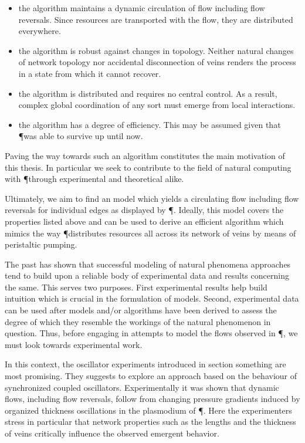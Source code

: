 	\begin{itemize}
		\item the algorithm maintains a dynamic circulation of flow including flow reversals. Since resources are transported with the flow, they are distributed everywhere.
		\item the algorithm is robust against changes in topology. Neither natural changes of network topology nor accidental disconnection of veins renders the process in a state from which it cannot recover.
		\item the algorithm is distributed and requires no central control. As a result, complex global coordination of any sort must emerge from local interactions.
		\item the algorithm has a degree of efficiency. This may be assumed given that \P was able to survive up until now.
	\end{itemize}

	Paving the way towards such an algorithm constitutes the main motivation of this thesis. In particular we seek to contribute to the field of natural computing with \P through experimental and theoretical alike.

	Ultimately, we aim to find an model which yields a circulating flow including flow reversals for individual edges as displayed by \P. Ideally, this model covers the properties listed above and can be used to derive an efficient algorithm which mimics the way \P distributes resources all across its network of veins by means of peristaltic pumping. 

	The past has shown that successful modeling of natural phenomena approaches tend to build upon a reliable body of experimental data and results concerning the same. This serves two purposes. First experimental results help build intuition which is crucial in the formulation of models. Second, experimental data can be used after models and/or algorithms have been derived to assess the degree of which they resemble the workings of the natural phenomenon in question. Thus, before engaging in attempts to model the flows observed in \P, we must look towards experimental work.

	In this context, the oscillator experiments introduced in section something are most promising. They suggests to explore an approach based on the behaviour of synchronized coupled oscillators. Experimentally it was shown that dynamic flows, including flow reversals, follow from changing pressure gradients induced by organized thickness oscillations in the plasmodium of \P. Here the experimenters stress in particular that network properties such as the lengths and the thickness of veins critically influence the observed emergent behavior. 

